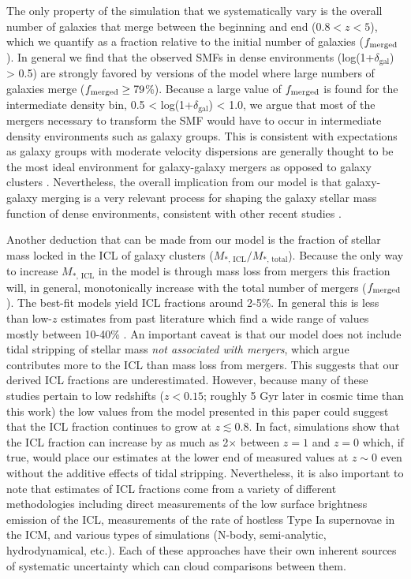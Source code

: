 \documentclass[a4paper,fleqn,usenatbib]{mnras}
\begin{document}
The only property of the simulation that we systematically vary is the overall number of galaxies that merge between the beginning and end ($0.8 < z < 5$), which we quantify as a fraction relative to the initial number of galaxies ($f_{\rm{merged}}$).
In general we find that the observed SMFs in dense environments (log(1+$\delta_{\mathrm{gal}}$) > 0.5) are strongly favored by versions of the model where large numbers of galaxies merge ($f_{\rm{merged}} \geq 79$\%).
Because a large value of $f_{\rm{merged}}$ is found for the intermediate density bin, 0.5 < log(1+$\delta_{\mathrm{gal}}$) < 1.0, we argue that most of the mergers necessary to transform the SMF would have to occur in intermediate density environments such as galaxy groups.
This is consistent with expectations as galaxy groups with moderate velocity dispersions are generally thought to be the most ideal environment for galaxy-galaxy mergers as opposed to galaxy clusters \citep{Lin2010}.
Nevertheless, the overall implication from our model is that galaxy-galaxy merging is a very relevant process for shaping the galaxy stellar mass function of dense environments, consistent with other recent studies \citep{Davidzon2016, Steinhardt2017}.


Another deduction that can be made from our model is the fraction of stellar mass locked in the ICL of galaxy clusters ($M_{*,\,\mathrm{ICL}} / M_{*,\,\mathrm{total}}$).
Because the only way to increase $M_{*,\,\mathrm{ICL}}$ in the model is through mass loss from mergers this fraction will, in general, monotonically increase with the total number of mergers ($f_{\rm{merged}}$).
The best-fit models yield ICL fractions around 2-5\%.
In general this is less than low-$z$ estimates from past literature which find a wide range of values mostly between 10-40\% \citep[e.g.][]{Willman2004, Rudick2006, Gonzalez2007, Murante2007, Sand2011, Contini2014, Mihos2017}.
An important caveat is that our model does not include tidal stripping of stellar mass {\it not associated with mergers}, which \citet{Contini2014} argue contributes more to the ICL than mass loss from mergers.
This suggests that our derived ICL fractions are underestimated.
However, because many of these studies pertain to low redshifts ($z < 0.15$; roughly 5 Gyr later in cosmic time than this work) the low values from the model presented in this paper could suggest that the ICL fraction continues to grow at $z \lesssim 0.8$.
In fact, simulations show that the ICL fraction can increase by as much as 2$\times$ between $z=1$ and $z=0$ \citep{Willman2004, Rudick2006} which, if true, would place our estimates at the lower end of measured values at $z\sim0$ even without the additive effects of tidal stripping.
Nevertheless, it is also important to note that estimates of ICL fractions come from a variety of different methodologies including direct measurements of the low surface brightness emission of the ICL, measurements of the rate of hostless Type Ia supernovae in the ICM, and various types of simulations (N-body, semi-analytic, hydrodynamical, etc.).
Each of these approaches have their own inherent sources of systematic uncertainty which can cloud comparisons between them.
\end{document}

